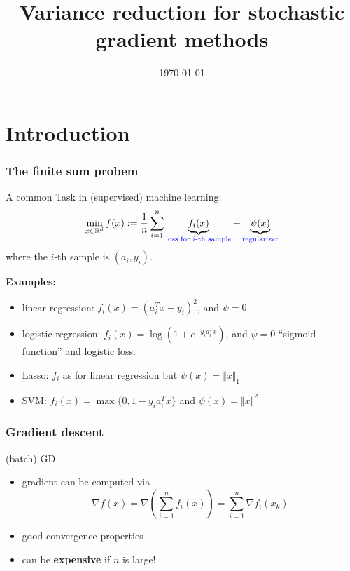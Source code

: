 \documentclass[aspectratio=149]{beamer}
\title{Variance reduction for stochastic gradient methods}
\date{\today}
\begin{document}
\maketitle
\frame{\tableofcontents}


\section{Introduction}%

\begin{frame}
  \frametitle{The finite sum probem}
  A common Task in (supervised) machine learning:
  \begin{equation}
    \min_{x\in \mathbb{R}^d} f(x) := \frac{1}{n} \sum_{i=1}^{n} \underbrace{f_i(x)}_{\textcolor{blue}{\text{loss for $i$-th sample}}} + \underbrace{\psi(x)}_{\textcolor{blue}{\text{regularizer}}}
  \end{equation}
  where the $i$-th sample is $(a_i, y_i)$.

  \textbf{Examples:}
  \begin{itemize}
    \item linear regression: $f_i(x) = {(a_i^T x -y_i)}^2$, and $\psi=0$
    \item logistic regression: $f_i(x) = \log(1+e^{-y_i a_i^T x})$, and $\psi=0$
          ``sigmoid function'' and logistic loss.
    \item Lasso: $f_i$ as for linear regression but $\psi(x) = \Vert x \Vert_1$
    \item SVM: $f_i(x) = \max \{0 , 1 - y_i a_i^T x\}$ and $\psi(x)= \Vert x \Vert^2$
  \end{itemize}
\end{frame}

\begin{frame}
  \frametitle{Gradient descent}
  \begin{algorithm}[H]
    \caption{(batch) GD}
    \begin{algorithmic}[1]
      \EndFor{}
    \end{algorithmic}
  \end{algorithm}

  \begin{itemize}
    \item gradient can be computed via
          \begin{equation}
            \nabla f(x) = \nabla \left(\sum_{i=1}^{n}f_i(x)\right) = \sum_{i=1}^{n} \nabla f_i(x_k)
          \end{equation}
    \item good convergence properties
    \item can be \textbf{expensive} if $n$ is large!
  \end{itemize}
\end{frame}
\end{document}
